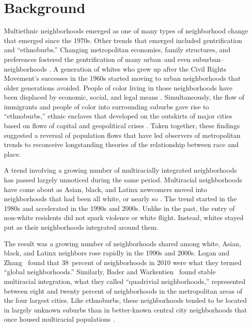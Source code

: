 \documentclass{baderart}
\begin{document}
\section{Background}\label{background}
Multiethnic neighborhoods emerged as one of many types of neighborhood change that emerged since the 1970s. Other trends that emerged included gentrification and ``ethnoburbs.'' Changing metropolitan economies, family structures, and preferences fostered the gentrification of many urban--and even suburban--neighborhoods \citep{rose_rethinking_1984, slater_gentrification_2004, lung-amam_trespassers?:_2017}. A generation of whites who grew up after the Civil Rights Movement's successes in the 1960s started moving to urban neighborhoods that older generations avoided. People of color living in those neighborhoods have been displaced by economic, social, and legal means \citep{freeman_there_2006, hyra_back---city_2014, hyra_race_2017}. Simultaneously, the flow of immigrants and people of color into surrounding suburbs gave rise to ``ethnoburbs,'' ethnic enclaves that developed on the outskirts of major cities based on flows of capital and geopolitical crises \citep{li_anatomy_1998,  lung-amam_trespassers?:_2017, kye_rise_2018}. Taken together, these findings suggested a reversal of population flows that have led observers of metropolitan trends to reconceive longstanding theories of the relationship between race and place. 

A trend involving a growing number of multiracially integrated neighborhoods has passed largely unnoticed during the same period. Multiracial neighborhoods have come about as Asian, black, and Latinx newcomers moved into neighborhoods that had been all white, or nearly so \citep{logan_global_2010, bader_fragmented_2016} . The trend started in the 1980s and accelerated in the 1990s and 2000s. Unlike in the past, the entry of non-white residents did not spark violence or white flight. Instead, whites stayed put as their neighborhoods integrated around them. 

The result was a growing number of neighborhoods shared among white, Asian, black, and Latinx neighbors rose rapidly in the 1990s and 2000s. Logan and Zhang~\citeyearpar{logan_global_2011} found that 38~percent of neighborhoods in 2010 were what they termed ``global neighborhoods.'' Similarly, Bader and Warkentien~\citeyearpar{bader_fragmented_2016} found stable multiracial integration, what they called ``quadrivial neighborhoods,'' represented between eight and twenty percent of neighborhoods in the metropolitan areas of the four largest cities. Like ethnoburbs, these neighborhoods tended to be located in largely unknown suburbs than in better-known central city neighborhoods that once housed multiracial populations \citep{bader_fragmented_2016, parisi_remaking_2019}. 
\end{document}
